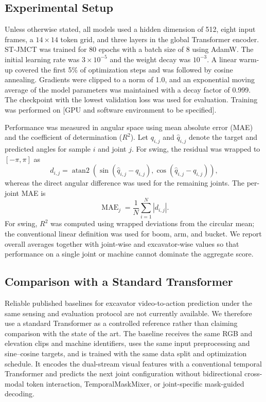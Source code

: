 \documentclass[journal]{IEEEtran}
\begin{document}
\subsection{Experimental Setup}
\label{subsec:experimental_setup}

Unless otherwise stated, all models used a hidden dimension of 512, eight
input frames, a $14\times14$ token grid, and three layers in the global
Transformer encoder. ST-JMCT was trained for 80 epochs with a batch size of 8
using AdamW. The initial learning rate was $3\times10^{-5}$ and the weight
decay was $10^{-3}$. A linear warm-up covered the first 5\% of optimization
steps and was followed by cosine annealing. Gradients were clipped to a norm of
1.0, and an exponential moving average of the model parameters was maintained
with a decay factor of 0.999. The checkpoint with the lowest validation loss
was used for evaluation. Training was performed on [GPU and software
environment to be specified].

Performance was measured in angular space using mean absolute error (MAE) and
the coefficient of determination ($R^2$). Let $q_{i,j}$ and
$\hat{q}_{i,j}$ denote the target and predicted angles for sample $i$ and joint
$j$. For swing, the residual was wrapped to $[-\pi,\pi]$ as
\begin{equation}
d_{i,j}=\operatorname{atan2}\!\left(
\sin(\hat{q}_{i,j}-q_{i,j}),
\cos(\hat{q}_{i,j}-q_{i,j})\right),
\label{eq:circular_error}
\end{equation}
whereas the direct angular difference was used for the remaining joints. The
per-joint MAE is
\begin{equation}
\operatorname{MAE}_{j}=\frac{1}{N}\sum_{i=1}^{N}|d_{i,j}|.
\label{eq:mae}
\end{equation}
For swing, $R^2$ was computed using wrapped deviations from the circular mean;
the conventional linear definition was used for boom, arm, and bucket. We
report overall averages together with joint-wise and excavator-wise values so
that performance on a single joint or machine cannot dominate the aggregate
score.

\subsection{Comparison with a Standard Transformer}
\label{subsec:baseline}

Reliable published baselines for excavator video-to-action prediction under
the same sensing and evaluation protocol are not currently available. We
therefore use a standard Transformer as a controlled reference rather than
claiming comparison with the state of the art. The baseline receives the same
RGB and elevation clips and machine identifiers, uses the same input
preprocessing and sine--cosine targets, and is trained with the same data split
and optimization schedule. It encodes the dual-stream visual features with a
conventional temporal Transformer and predicts the next joint configuration
without bidirectional cross-modal token interaction, TemporalMaskMixer, or
joint-specific mask-guided decoding.
\end{document}
